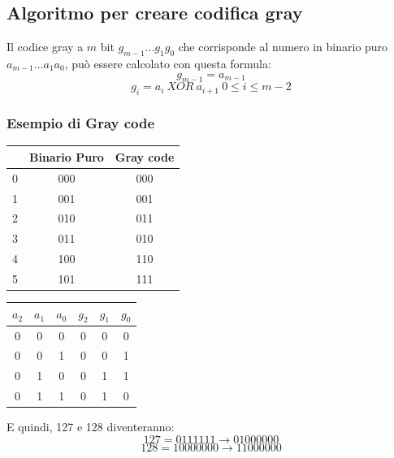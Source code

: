\documentclass{report}
\begin{document}
	\newpage
		
	\subsection{Algoritmo per creare codifica gray}
	Il codice gray a $m$ bit $g_{m-1}...g_1g_0$ che corrisponde al numero in binario puro $a_{m-1}...a_1a_0$, può essere calcolato con questa formula:
	$$
	g_{m-1} = a_{m-1}
	$$
	$$
	g_i = a_i \ XOR \ a_{i+1} \ 0 \leq i \leq m-2
	$$
		
	\subsubsection{Esempio di Gray code}
	\begin{center}
		\begin{tabular}{| c || c | c |} 
			\hline
			  & Binario Puro & Gray code \\
			\hline 
			\hline
			0 & 000          & 000       \\
			\hline
			1 & 001          & 001       \\
			\hline
			2 & 010          & 011       \\
			\hline
			3 & 011          & 010       \\
			\hline
			4 & 100          & 110       \\
			\hline
			5 & 101          & 111       \\
			\hline
		\end{tabular}
	\end{center}
		
	\begin{center}
		\begin{tabular}{| c | | c | c | | c | c | c |} 
						
			\hline
			$a_2$ & $a_1$ & $a_0$ & $g_2$ & $g_1$ & $g_0$ \\
			\hline 
			0     & 0     & 0     & 0     & 0     & 0     \\
			\hline
			0     & 0     & 1     & 0     & 0     & 1     \\
			\hline
			0     & 1     & 0     & 0     & 1     & 1     \\
			\hline
			0     & 1     & 1     & 0     & 1     & 0     \\
			\hline
		\end{tabular}
	\end{center}
	E quindi, 127 e 128 diventeranno:
	$$
	127 = 0111111 \rightarrow 01000000
	$$
	$$
	128 = 10000000 \rightarrow 11000000
	$$
		
\end{document}
